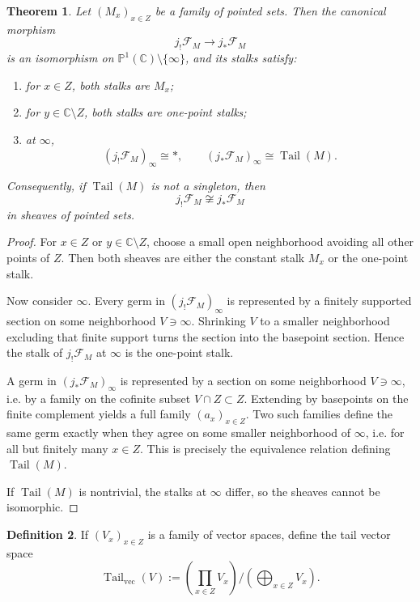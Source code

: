 \documentclass[11pt,a4paper]{article}
\newtheorem{theorem}{Theorem}[section]
\theoremstyle{definition}
\newtheorem{definition}[theorem]{Definition}
\theoremstyle{remark}
\DeclareMathOperator{\Tail}{Tail}
\newcommand{\CC}{\mathbb C}
\newcommand{\PP}{\mathbb P}
\begin{document}
\begin{theorem}\label{thm:stalks-at-infty}
Let $(M_x)_{x\in Z}$ be a family of pointed sets.  Then the canonical morphism
\[
j_!\mathcal F_M\longrightarrow j_*\mathcal F_M
\]
is an isomorphism on $\PP^1(\CC)\setminus\{\infty\}$, and its stalks satisfy:
\begin{enumerate}[label=(\roman*)]
\item for $x\in Z$, both stalks are $M_x$;
\item for $y\in\CC\setminus Z$, both stalks are one-point stalks;
\item at $\infty$,
\[
(j_!\mathcal F_M)_\infty\cong *,
\qquad
(j_*\mathcal F_M)_\infty\cong \Tail(M).
\]
\end{enumerate}
Consequently, if $\Tail(M)$ is not a singleton, then
\[
j_!\mathcal F_M\not\cong j_*\mathcal F_M
\]
in sheaves of pointed sets.
\end{theorem}

\begin{proof}
For $x\in Z$ or $y\in\CC\setminus Z$, choose a small open neighborhood avoiding all other points of $Z$.  Then both sheaves are either the constant stalk $M_x$ or the one-point stalk.

Now consider $\infty$.  Every germ in $(j_!\mathcal F_M)_\infty$ is represented by a finitely supported section on some neighborhood $V\ni\infty$.  Shrinking $V$ to a smaller neighborhood excluding that finite support turns the section into the basepoint section.  Hence the stalk of $j_!\mathcal F_M$ at $\infty$ is the one-point stalk.

A germ in $(j_*\mathcal F_M)_\infty$ is represented by a section on some neighborhood $V\ni\infty$, i.e. by a family on the cofinite subset $V\cap Z\subset Z$.  Extending by basepoints on the finite complement yields a full family $(a_x)_{x\in Z}$.  Two such families define the same germ exactly when they agree on some smaller neighborhood of $\infty$, i.e. for all but finitely many $x\in Z$.  This is precisely the equivalence relation defining $\Tail(M)$.

If $\Tail(M)$ is nontrivial, the stalks at $\infty$ differ, so the sheaves cannot be isomorphic.
\end{proof}

\begin{definition}
If $(V_x)_{x\in Z}$ is a family of vector spaces, define the tail vector space
\[
\Tail_{\mathrm{vec}}(V):=\left(\prod_{x\in Z}V_x\right)\Big/\left(\bigoplus_{x\in Z}V_x\right).
\]
\end{definition}
\end{document}
